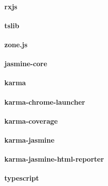 \paragraph{rxjs}

\paragraph{tslib}

\paragraph{zone.js}

\paragraph{jasmine-core}

\paragraph{karma}

\paragraph{karma-chrome-launcher}

\paragraph{karma-coverage}

\paragraph{karma-jasmine}

\paragraph{karma-jasmine-html-reporter}

\paragraph{typescript}


